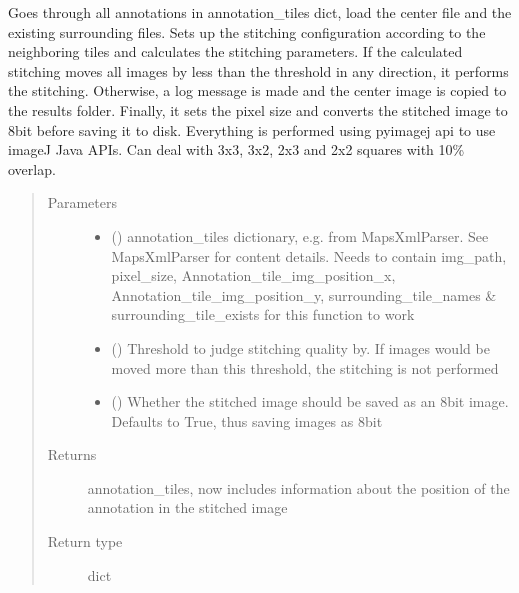 \documentclass[letterpaper,10pt,english]{sphinxmanual}
\begin{document}
\begin{fulllineitems}
\begin{fulllineitems}
Goes through all annotations in annotation\_tiles dict, load the center file and the existing surrounding files.
Sets up the stitching configuration according to the neighboring tiles and calculates the stitching parameters.
If the calculated stitching moves all images by less than the threshold in any direction, it performs the
stitching. Otherwise, a log message is made and the center image is copied to the results folder.
Finally, it sets the pixel size and converts the stitched image to 8bit before saving it to disk. Everything is
performed using pyimagej api to use imageJ Java APIs.
Can deal with 3x3, 3x2, 2x3 and 2x2 squares with 10\% overlap.
\begin{quote}\begin{description}
\item[{Parameters}] \leavevmode\begin{itemize}
\item {} 
 () \textendash{} annotation\_tiles dictionary, e.g. from MapsXmlParser. See MapsXmlParser for content
details. Needs to contain img\_path, pixel\_size, Annotation\_tile\_img\_position\_x,
Annotation\_tile\_img\_position\_y, surrounding\_tile\_names \& surrounding\_tile\_exists for this function
to work

\item {} 
 () \textendash{} Threshold to judge stitching quality by. If images would be moved more than this
threshold, the stitching is not performed

\item {} 
 () \textendash{} Whether the stitched image should be saved as an 8bit image. Defaults to True, thus saving
images as 8bit

\end{itemize}

\item[{Returns}] \leavevmode
annotation\_tiles, now includes information about the position of the annotation in the stitched image

\item[{Return type}] \leavevmode
dict

\end{description}\end{quote}


\end{fulllineitems}
\end{fulllineitems}
\end{document}
